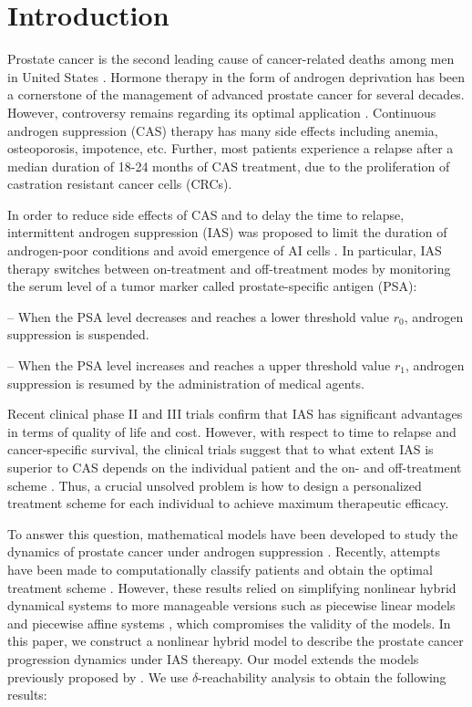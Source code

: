 \section{Introduction}
Prostate cancer is the second leading cause of cancer-related deaths among men in United States \citep{cancerstat}. Hormone therapy in the form of androgen deprivation has been a cornerstone of the management of advanced prostate cancer for several decades. However, controversy remains regarding its optimal application \citep{nru}. Continuous androgen suppression (CAS) therapy has many side effects including anemia, osteoporosis, impotence, etc. Further, most patients experience a relapse after a median duration of 18-24 months of CAS treatment, due to the proliferation of castration resistant cancer cells (CRCs).

In order to reduce side effects of CAS and to delay the time to relapse, intermittent androgen suppression (IAS) was proposed to limit the duration of androgen-poor conditions and avoid emergence of AI cells \citep{bruchovsky95}. In particular, IAS therapy switches between on-treatment and off-treatment modes by monitoring the serum level of a tumor marker called prostate-specific antigen (PSA):

-- When the PSA level decreases and reaches a lower threshold value $r_0$, androgen suppression is suspended.

-- When the PSA level increases and reaches a upper threshold value $r_1$, androgen suppression is resumed by the administration of medical agents.

Recent clinical phase II and III trials confirm that IAS has significant advantages in terms of quality of life and cost. However, with respect to time to relapse and cancer-specific survival, the clinical trials suggest that to what extent IAS is superior to CAS depends on the individual patient and the on- and off-treatment scheme \citep{bruchovsky06,bruchovsky07,book13}. Thus, a crucial unsolved problem is how to design a personalized treatment scheme for each individual to achieve maximum therapeutic efficacy.

To answer this question, mathematical models have been developed to study the dynamics of prostate cancer under androgen suppression \citep{jackson04,ideta08, hirata10,pnas11}. Recently, attempts have been made to computationally classify patients and obtain the optimal treatment scheme \citep{chaos10,suzuki10}. However, these results relied on simplifying nonlinear hybrid dynamical systems to more manageable versions such as piecewise linear models \citep{chaos10} and piecewise affine systems \citep{suzuki10}, which compromises the validity of the models. In this paper, we construct a nonlinear hybrid model to describe the prostate cancer progression dynamics under IAS thereapy. Our model extends the models previously proposed by \citep{jackson04,ideta08}. We use $\delta$-reachability analysis to obtain the following results:

